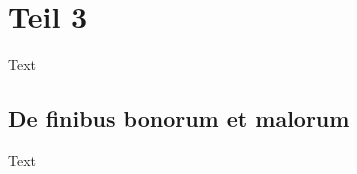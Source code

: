 %
%
%
%
\section{Teil 3\label{brown:section:teil3}}

Text

\subsection{De finibus bonorum et malorum
\label{brown:subsection:malorum}}

Text


